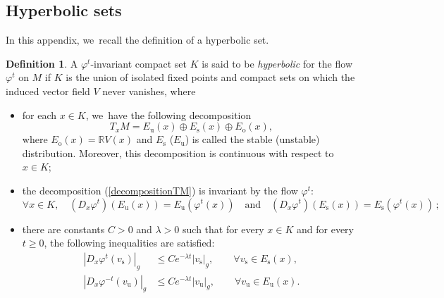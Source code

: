 \documentclass[JEP,XML,SOM,Unicode,NoEqCountersInSection,NoFloatCountersInSection,published]{cedram}
\newcommand{\ro}{\mathrm{o}}
\newcommand{\rs}{\mathrm{s}}
\newcommand{\ru}{\mathrm{u}}
\theoremstyle{definition}
\newtheorem{definition}{Definition}[section]
\theoremstyle{plain}
\newcommand{\R}{\mathbb{R}}
\begin{document}
\begin{appendix}

\section{Hyperbolic sets}\label{Appendix: hyperbolic set}

In this appendix, we~recall the definition of a hyperbolic set.

\begin{definition}A $\varphi^t$-invariant compact set $K$ is said to be \emph{hyperbolic} for the flow~$\varphi^t$ on $M$ if $K$ is the union of isolated fixed points and compact sets on which the induced vector field $V$ never vanishes, where
\begin{itemize}
\item for each $x \in K$, we~have the following decomposition
\begin{equation}\label{decompositionTM}
T_x M = E_\ru (x) \oplus E_\rs(x) \oplus E_\ro (x),
\end{equation}
where $E_\ro (x) = \R V(x)$ and $E_\rs$ (\resp $E_\ru$) is called the stable (\resp unstable) distribution. Moreover, this decomposition is continuous with respect to $x \in K$;
\item the decomposition (\ref{decompositionTM}) is invariant by the flow $\varphi^t$:
\[
\forall x \in K, \quad (D_x \varphi^t)(E_\ru(x)) = E_\ru(\varphi^t (x)) \quad \text{and} \quad (D_x \varphi^t)(E_\rs(x)) = E_\rs(\varphi^t (x))\,;
\]
\item there are constants $C > 0$ and $\lambda > 0$ such that for every $x \in K$ and for every $t \geq 0$, the following inequalities are satisfied:
\begin{equation}\label{eq: hyperbolic inegality on an hyperbolic set}
\begin{split}
| D_x \varphi^t (v_\rs) |_g &\leq C e^{-\lambda t} |v_\rs|_g, \quad \quad \forall v_\rs \in E_\rs(x), \\
| D_x \varphi^{-t} (v_\ru) |_g &\leq C e^{-\lambda t} |v_\ru|_g, \quad \quad \forall v_\ru \in E_\ru(x).
\end{split}
\end{equation}
\end{itemize}
\end{definition}


\end{appendix}
\end{document}
